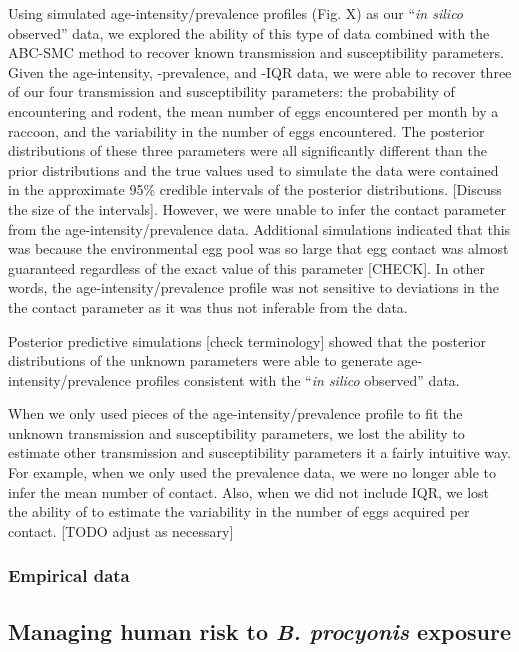\documentclass[11pt]{article}
\begin{document}
Using simulated age-intensity/prevalence profiles (Fig. X) as our ``\emph{in silico} observed'' data, we explored the ability of this type of data combined with the ABC-SMC method to recover known transmission and susceptibility parameters.  Given the age-intensity, -prevalence, and -IQR data, we were able to recover three of our four transmission and susceptibility parameters: the probability of encountering and rodent, the mean number of eggs encountered per month by a raccoon, and the variability in the number of eggs encountered. The posterior distributions of these three parameters were all significantly different than the prior distributions and the true values used to simulate the data were contained in the approximate 95\% credible intervals of the posterior distributions.  [Discuss the size of the intervals]. However, we were unable to infer the contact parameter from the age-intensity/prevalence data. Additional simulations indicated that this was because the environmental egg pool was so large that egg contact was almost guaranteed regardless of the exact value of this parameter [CHECK].  In other words, the age-intensity/prevalence profile was not sensitive to deviations in the the contact parameter as it was thus not inferable from the data.

Posterior predictive simulations [check terminology] showed that the posterior distributions of the unknown parameters were able to generate age-intensity/prevalence profiles consistent with the ``\emph{in silico} observed'' data. 

When we only used pieces of the age-intensity/prevalence profile to fit the unknown transmission and susceptibility parameters, we lost the ability to estimate other transmission and susceptibility parameters it a fairly intuitive way. For example, when we only used the prevalence data, we were no longer able to infer the mean number of contact.  Also, when we did not include IQR, we lost the ability of to estimate the variability in the number of eggs acquired per contact. [TODO adjust as necessary]

\subsubsection{Empirical data}




\subsection{Managing human risk to \emph{B. procyonis} exposure}
\end{document}

